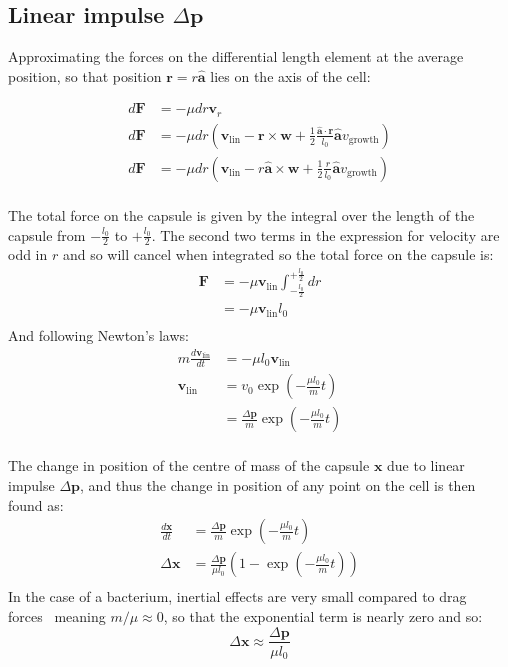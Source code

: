 \documentclass{report}
\let\oldhat\hat
\renewcommand{\vec}[1]{\mathbf{#1}}
\renewcommand{\hat}[1]{\oldhat{\mathbf{#1}}}
\newcommand{\deltap}{\Delta \vec{p}}
\begin{document}
\begin{appendices}
\section{Linear impulse $\deltap$}
Approximating the forces on the differential length element at the average
position, so that position $\vec{r}=r\hat{a}$ lies on the axis of the cell:

\begin{align*}
d\vec{F} &= -\mu dr \vec{v}_r\\
d\vec{F} &= -\mu dr
\left(
\vec{v}_\textrm{lin}
- \vec{r} \times \vec{w}
+ \frac{1}{2}\frac{\hat{a}\cdot\vec{r}}{l_0}\hat{a}v_\textrm{growth}
\right)
\\
d\vec{F} &= -\mu dr
\left(
\vec{v}_\textrm{lin}
- r\hat{a} \times \vec{w}
+ \frac{1}{2}\frac{r}{l_0}\hat{a}v_\textrm{growth}
\right)
\\
\end{align*}

The total force on the capsule is given by the integral over the length of
the capsule from $-\frac{l_0}{2}$ to $+\frac{l_0}{2}$. The
second two terms in the expression for velocity are odd in $r$ and
so will cancel when integrated so the total force on
the capsule is:
\begin{align*}
\vec{F} &= -\mu \vec{v}_\textrm{lin} \int_{-\frac{l_0}{2}}^{+\frac{l_0}{2}} dr \\
&= -\mu \vec{v}_\textrm{lin} l_0 \\
\end{align*}
And following Newton's laws:
\begin{align*}
m \frac{d\vec{v}_\textrm{lin}}{dt} &= -\mu  l_0 \vec{v}_\textrm{lin}\\
\vec{v}_\textrm{lin} &= v_0\exp{(-\frac{\mu l_0}{m}t)} \\
&= \frac{\deltap}{m}\exp{(-\frac{\mu l_0}{m}t)} \\
\end{align*}

The change in position of the centre of mass of the capsule $\vec{x}$ due to
linear impulse $\deltap$, and thus the change in position of any point on the
cell is then found as:
\begin{align*}
\frac{d\vec{x}}{dt} &= \frac{\deltap}{m}\exp{(-\frac{\mu l_0}{m}t)} \\
\Delta \vec{x} &= \frac{\deltap}{\mu l_0}\left(1-\exp{(-\frac{\mu l_0}{m}t)}\right) \\
\end{align*}
In the case of a bacterium, inertial effects are very small compared to drag
forces~\cite{Purcell:1977} meaning $m/\mu \approx 0$, so that the
exponential term is nearly zero and so:
\begin{equation}
\Delta \vec{x} \approx \frac{\deltap}{\mu l_0}
\label{eqn:deltax}
\end{equation}


\end{appendices}
\end{document}
